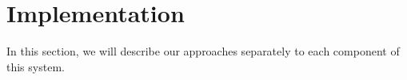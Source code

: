 \section{Implementation}
\label{sec:implementation}

In this section, we will describe our approaches separately to each component of this system. 






